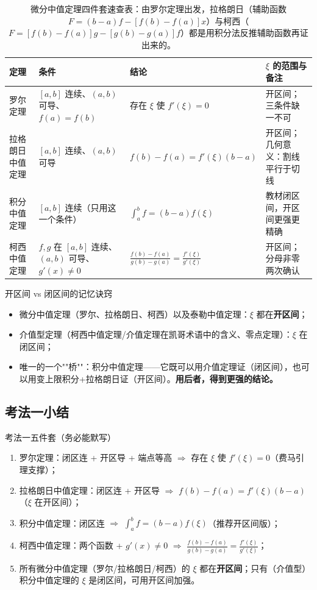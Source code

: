 \documentclass[a4paper]{article}
\begin{document}
\begin{table}[H]
\centering
\begin{tabular}{p{2.6cm}p{4.2cm}p{4.2cm}p{4.0cm}}
\toprule
\textbf{定理} & \textbf{条件} & \textbf{结论} & \textbf{$\xi$ 的范围与备注} \\
\midrule
罗尔定理 & $[a,b]$ 连续、$(a,b)$ 可导、$f(a)=f(b)$ & 存在 $\xi$ 使 $f'(\xi)=0$ & 开区间；三条件缺一不可 \\
拉格朗日中值定理 & $[a,b]$ 连续、$(a,b)$ 可导 & $f(b)-f(a)=f'(\xi)(b-a)$ & 开区间；几何意义：割线平行于切线 \\
积分中值定理 & $[a,b]$ 连续（只用这一个条件） & $\int_a^b f=(b-a)f(\xi)$ & 教材闭区间，开区间更强更精确 \\
柯西中值定理 & $f,g$ 在 $[a,b]$ 连续、$(a,b)$ 可导、$g'(x)\neq0$ & $\frac{f(b)-f(a)}{g(b)-g(a)}=\frac{f'(\xi)}{g'(\xi)}$ & 开区间；分母非零两次确认 \\
\bottomrule
\end{tabular}
\caption{微分中值定理四件套速查表：由罗尔定理出发，拉格朗日（辅助函数 $F=(b-a)f-[f(b)-f(a)]x$）与柯西（$F=[f(b)-f(a)]g-[g(b)-g(a)]f$）都是用积分法反推辅助函数再证出来的。}
\end{table}

\begin{knowledgebox}{开区间 vs 闭区间的记忆诀窍}
\begin{itemize}
\item 微分中值定理（罗尔、拉格朗日、柯西）以及泰勒中值定理：$\xi$ 都在\textbf{开区间}；
\item 介值型定理（柯西中值定理/介值定理在凯哥术语中的含义、零点定理）：$\xi$ 在闭区间；
\item 唯一的一个""桥""：积分中值定理——它既可以用介值定理证（闭区间），也可以用变上限积分+拉格朗日证（开区间）。\textbf{用后者，得到更强的结论。}
\end{itemize}
\end{knowledgebox}

\subsection{考法一小结}

\begin{importantbox}{考法一五件套（务必能默写）}
\begin{enumerate}
\item 罗尔定理：闭区连 + 开区导 + 端点等高 $\Rightarrow$ 存在 $\xi$ 使 $f'(\xi)=0$（费马引理支撑）；
\item 拉格朗日中值定理：闭区连 + 开区导 $\Rightarrow$ $f(b)-f(a)=f'(\xi)(b-a)$（$\xi$ 在开区间）；
\item 积分中值定理：闭区连 $\Rightarrow$ $\int_a^b f=(b-a)f(\xi)$（推荐开区间版）；
\item 柯西中值定理：两个函数 + $g'(x)\neq0$ $\Rightarrow$ $\frac{f(b)-f(a)}{g(b)-g(a)}=\frac{f'(\xi)}{g'(\xi)}$；
\item 所有微分中值定理（罗尔/拉格朗日/柯西）的 $\xi$ 都在\textbf{开区间}；只有（介值型）积分中值定理的 $\xi$ 是闭区间，可用开区间加强。
\end{enumerate}
\end{importantbox}
\end{document}
